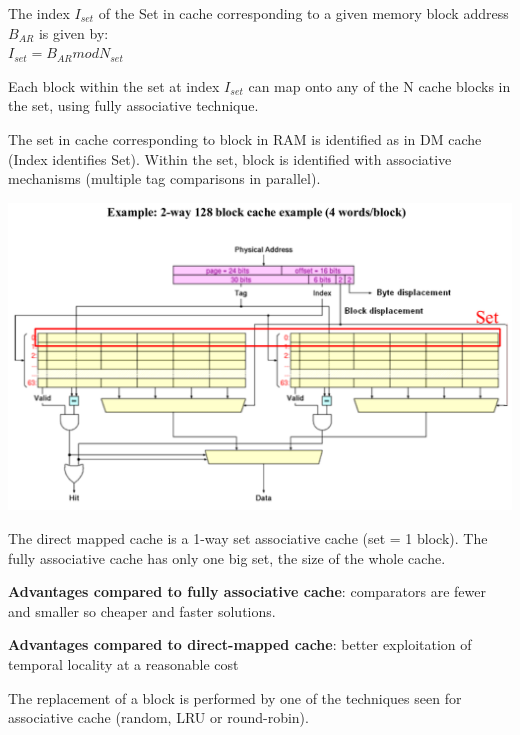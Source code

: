 The index $I_{set}$ of the Set in cache corresponding to a given memory block address $B_{AR}$ is given by:\\
$I_{set} = B_{AR} mod N_{set}$

Each block within the set at index  $I_{set}$ can map onto any of the N cache blocks in the set, using fully associative technique.

The set in cache corresponding to block in RAM is identified as in DM cache (Index identifies Set). Within the set, block is identified with associative mechanisms (multiple tag comparisons in parallel).

\includegraphics[width=\textwidth]{images/n-way_set_associative.png}

The direct mapped cache is a 1-way set associative cache (set = 1 block).
The fully associative cache has only one big set, the size of the whole cache.

\textbf{Advantages compared to fully associative cache}: comparators are fewer and smaller so cheaper and faster solutions.

\textbf{Advantages compared to direct-mapped cache}: better exploitation of temporal locality at a reasonable cost

The replacement of a block is performed by one of the techniques seen for associative cache (random, LRU or round-robin).


